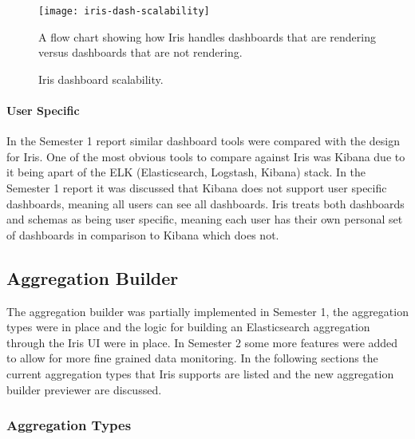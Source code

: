 \documentclass[12pt,a4paper,titlepage]{report}
\begin{document}
\begin{figure}[H]
\begin{tcolorbox}
\begin{center}
\texttt{[image: iris-dash-scalability]}
\end{center}
A flow chart showing how Iris handles dashboards that are rendering versus dashboards that are not rendering.
\end{tcolorbox}
\caption{Iris dashboard scalability.}
\end{figure}

\paragraph{User Specific}
In the Semester 1 report similar dashboard tools were compared with the design for Iris. One of the most obvious tools to compare against Iris was Kibana due to it being apart of the ELK (Elasticsearch, Logstash, Kibana) stack. In the Semester 1 report it was discussed that Kibana does not support user specific dashboards, meaning all users can see all dashboards. Iris treats both dashboards and schemas as being user specific, meaning each user has their own personal set of dashboards in comparison to Kibana which does not.

\subsection{Aggregation Builder}
The aggregation builder was partially implemented in Semester 1, the aggregation types were in place and the logic for building an Elasticsearch aggregation through the Iris UI were in place. In Semester 2 some more features were added to allow for more fine grained data monitoring. In the following sections the current aggregation types that Iris supports are listed and the new aggregation builder previewer are discussed.

\subsubsection{Aggregation Types}
\end{document}
